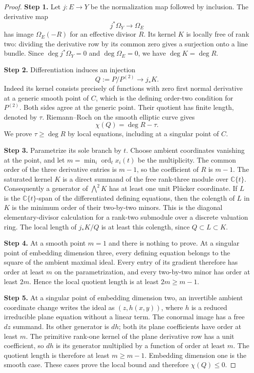 \begin{proof}
\noindent\textbf{Step 1.} Let $j:E\to Y$ be the normalization map followed by inclusion.
The derivative map
\[
 j^*\Omega_Y\longrightarrow\Omega_E
\]
has image $\Omega_E(-R)$ for an effective divisor $R$.
Its kernel $K$ is locally free of rank two: dividing the derivative
row by its common zero gives a surjection onto a line bundle.
Since $\deg j^*\Omega_Y=0$ and $\deg\Omega_E=0$, we have
$\deg K=\deg R$.

\noindent\textbf{Step 2.} Differentiation induces an injection
\[
 Q:=P/P^{(2)}\longrightarrow j_*K.
\]
Indeed its kernel consists precisely of functions with zero first
normal derivative at a generic smooth point of $C$, which is the
defining order-two condition for $P^{(2)}$. Both sides agree at the
generic point. Their quotient has finite length, denoted by $\tau$.
Riemann--Roch on the smooth elliptic curve gives
\[
 \chi(Q)=\deg R-\tau.
\]
We prove $\tau\ge\deg R$ by local equations, including at a
singular point of $C$.

\noindent\textbf{Step 3.} Parametrize its sole branch by $t$. Choose ambient coordinates
vanishing at the point, and let
$m=\min_i\operatorname{ord}_t x_i(t)$ be the multiplicity.
The common order of the three derivative entries is $m-1$,
so the coefficient of $R$ is $m-1$. The saturated kernel $K$
is a direct summand of the free rank-three module over
$\mathbb C\{t\}$. Consequently a generator of $\bigwedge^2K$
has at least one unit Pl\"ucker coordinate. If $L$ is the
$\mathbb C\{t\}$-span of the differentiated defining equations,
then the colength of $L$ in $K$ is the minimum order of their
two-by-two minors. This is the diagonal elementary-divisor
calculation for a rank-two submodule over a discrete valuation
ring. The local length of $j_*K/Q$ is at least this colength,
since $Q\subset L\subset K$.

\noindent\textbf{Step 4.} At a smooth point $m=1$ and there is nothing to prove.
At a singular point of embedding dimension three, every defining
equation belongs to the square of the ambient maximal ideal.
Every entry of its gradient therefore has order at least $m$
on the parametrization, and every two-by-two minor has order
at least $2m$. Hence the local quotient length is at least
$2m\ge m-1$.

\noindent\textbf{Step 5.} At a singular point of embedding dimension two, an invertible
ambient coordinate change writes the ideal as $(z,h(x,y))$,
where $h$ is a reduced irreducible plane equation without a
linear term. The conormal image has a free $dz$ summand.
Its other generator is $dh$; both its plane coefficients have
order at least $m$. The primitive rank-one kernel of the plane
derivative row has a unit coefficient, so $dh$ is its generator
multiplied by a function of order at least $m$. The quotient
length is therefore at least $m\ge m-1$. Embedding dimension
one is the smooth case. These cases prove the local bound and
therefore $\chi(Q)\le0$.


\end{proof}
